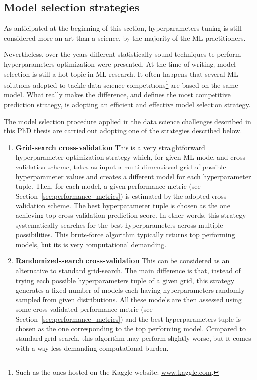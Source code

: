   
  \subsection{Model selection strategies} \label{sec:model_selection}
  As anticipated at the beginning of this section, hyperparameters tuning is still considered more an art than a science, by the majority of the ML practitioners.
  
  Nevertheless, over the years different statistically sound techniques to perform hyperparameters optimization were presented. At the time of writing, model selection is still a hot-topic in ML research. It often happens that several ML solutions adopted to tackle data science competitions\footnote{ Such as the ones hosted on the Kaggle website: \url{www.kaggle.com}.} are based on the same model. What really makes the difference, and defines the most competitive prediction strategy, is adopting an efficient and effective model selection strategy.
  
  The model selection procedure applied in the data science challenges described in this PhD thesis are carried out adopting one of the strategies described below.
  
  \begin{enumerate}
  	\item[] \textbf{Grid-search cross-validation} This is a very straightforward hyperparameter optimization strategy which, for given ML model and cross-validation scheme, takes as input a multi-dimensional grid of possible hyperparameter values and creates a different model for each hyperparameter tuple. Then, for each model, a given performance metric (see Section~\ref{sec:performance_metrics}) is estimated by the adopted cross-validation scheme.
  	The best hyperparameter tuple is chosen as the one achieving top cross-validation prediction score.
  	In other words, this strategy systematically searches for the best hyperparameters across multiple possibilities. 
  	This brute-force algorithm typically returns top performing models, but its is very computational demanding.
  	
 	\item[] \textbf{Randomized-search cross-validation} This can be considered as an alternative to standard grid-search. The main difference is that, instead of trying each possible hyperparameters tuple of a given grid, this strategy generates a fixed number of models each having hyperparameters randomly sampled from given distributions. All these models are then assessed using some cross-validated performance metric (see Section~\ref{sec:performance_metrics}) and the best hyperparameters tuple is chosen as the one corresponding to the top performing model.
 	Compared to standard grid-search, this algorithm may perform slightly worse, but it comes with a way less demanding computational burden.
  \end{enumerate}

